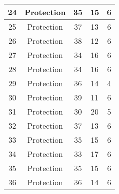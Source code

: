 \documentclass[results.tex]{subfiles}
\begin{document}
\begin{center}
\begin{tabular}{| c || c | c | c | c |}
            \hline
            24                      & Protection                   & 35                     & 15                      & 6                    \\
            \hline
            25                      & Protection                   & 37                     & 13                      & 6                    \\
            \hline
            26                      & Protection                   & 38                     & 12                      & 6                    \\
            \hline
            27                      & Protection                   & 34                     & 16                      & 6                    \\
            \hline
            28                      & Protection                   & 34                     & 16                      & 6                    \\
            \hline
            29                      & Protection                   & 36                     & 14                      & 4                    \\
            \hline
            30                      & Protection                   & 39                     & 11                      & 6                    \\
            \hline
            31                      & Protection                   & 30                     & 20                      & 5                    \\
            \hline
            32                      & Protection                   & 37                     & 13                      & 6                    \\
            \hline
            33                      & Protection                   & 35                     & 15                      & 6                    \\
            \hline
            34                      & Protection                   & 33                     & 17                      & 6                    \\
            \hline
            35                      & Protection                   & 35                     & 15                      & 6                    \\
            \hline
            36                      & Protection                   & 36                     & 14                      & 6                    \\

\end{tabular}
\end{center}
\end{document}
